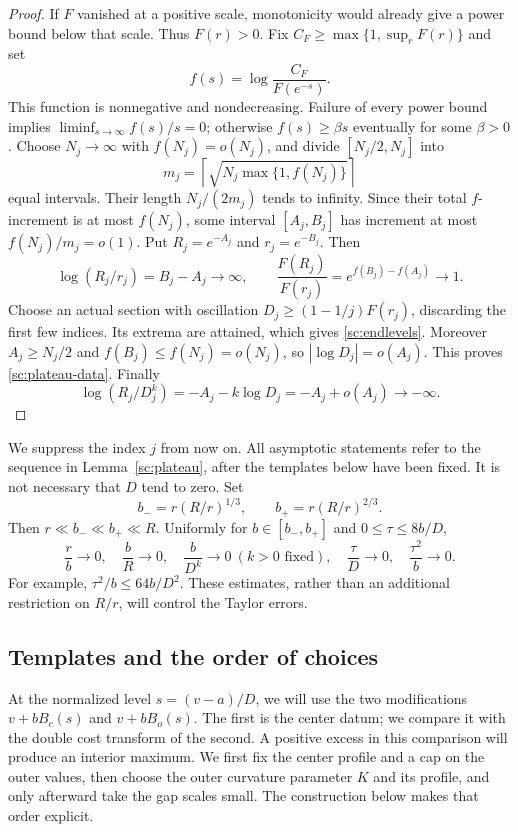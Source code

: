 \begin{proof}
If $F$ vanished at a positive scale, monotonicity would already give a
power bound below that scale.  Thus $F(r)>0$.
Fix $C_F\geq\max\{1,\sup_r F(r)\}$ and set
\[
 f(s)=\log\frac{C_F}{F(e^{-s})}.
\]
This function is nonnegative and nondecreasing.  Failure of every
power bound implies $\liminf_{s\to\infty}f(s)/s=0$; otherwise
$f(s)\geq\beta s$ eventually for some $\beta>0$.
Choose $N_j\to\infty$ with $f(N_j)=o(N_j)$, and divide
$[N_j/2,N_j]$ into
\[
 m_j=\left\lceil\sqrt{N_j\max\{1,f(N_j)\}}\right\rceil
\]
equal intervals.  Their length $N_j/(2m_j)$ tends to infinity.
Since their total $f$-increment is at most $f(N_j)$, some interval
$[A_j,B_j]$ has increment at most $f(N_j)/m_j=o(1)$.
Put $R_j=e^{-A_j}$ and $r_j=e^{-B_j}$.  Then
\[
 \log(R_j/r_j)=B_j-A_j\longrightarrow\infty,\qquad
 \frac{F(R_j)}{F(r_j)}=e^{f(B_j)-f(A_j)}\longrightarrow1.
\]
Choose an actual section with oscillation
$D_j\geq(1-1/j)F(r_j)$, discarding the first few indices.
Its extrema are attained, which gives \eqref{sc:endlevels}.
Moreover $A_j\geq N_j/2$ and $f(B_j)\leq f(N_j)=o(N_j)$,
so $|\log D_j|=o(A_j)$.
This proves \eqref{sc:plateau-data}.  Finally
\[
 \log(R_j/D_j^k)=-A_j-k\log D_j=-A_j+o(A_j)\longrightarrow-\infty.
\]
\end{proof}

We suppress the index $j$ from now on.  All asymptotic statements refer
to the sequence in Lemma~\ref{sc:plateau}, after the templates below
have been fixed.  It is not necessary that $D$ tend to zero.
Set
\begin{equation}
 b_-=r(R/r)^{1/3},\qquad b_+=r(R/r)^{2/3}.
 \label{sc:binterval}
\end{equation}
Then $r\ll b_-\ll b_+\ll R$.  Uniformly for $b\in[b_-,b_+]$ and
$0\leq\tau\leq8b/D$,
\begin{equation}
 \frac rb\to0,\quad \frac bR\to0,\quad
 \frac b{D^k}\to0\ (k>0\text{ fixed}),\quad
 \frac\tau D\to0,\quad \frac{\tau^2}{b}\to0.
 \label{sc:smallness}
\end{equation}
For example, $\tau^2/b\leq64b/D^2$.
These estimates, rather than an additional restriction on $R/r$,
will control the Taylor errors.

\subsection{Templates and the order of choices}

At the normalized level $s=(v-a)/D$, we will use the two
modifications $v+bB_c(s)$ and $v+bB_o(s)$.
The first is the center datum; we compare it with the double
cost transform of the second. A positive excess in this
comparison will produce an interior maximum. We first fix
the center profile and a cap on the outer values, then choose
the outer curvature parameter $K$ and its profile, and only
afterward take the gap scales small. The construction below
makes that order explicit.

